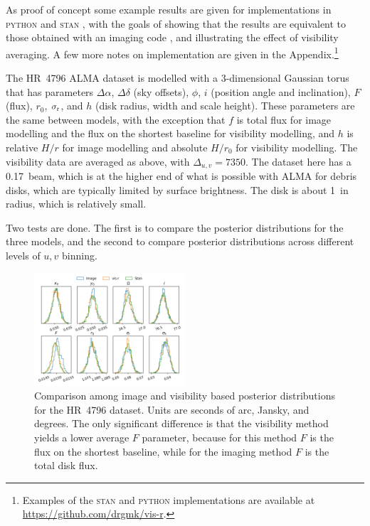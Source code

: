 \documentclass[fleqn,usenatbib]{mnras}
\begin{document}
As proof of concept some example results are given for implementations in \textsc{python} and \textsc{stan} \citep{2017JSS....76....1C}, with the goals of showing that the results are equivalent to those obtained with an imaging code \citep[e.g.][]{2021MNRAS.504.4497C}, and illustrating the effect of visibility averaging. A few more notes on implementation are given in the Appendix.\footnote{Examples of the \textsc{stan} and \textsc{python} implementations are available at \href{https://github.com/drgmk/vis-r}{https://github.com/drgmk/vis-r}.}


The HR~4796 ALMA dataset is modelled with a 3-dimensional Gaussian torus that has parameters $\Delta \alpha$, $\Delta \delta$ (sky offsets), $\phi$, $i$ (position angle and inclination), $F$ (flux), $r_0$, $\sigma_{\rm r}$, and $h$ (disk radius, width and scale height). These parameters are the same between models, with the exception that $f$ is total flux for image modelling and the flux on the shortest baseline for visibility modelling, and $h$ is relative $H/r$ for image modelling and absolute $H/r_0$ for visibility modelling. The visibility data are averaged as above, with $\Delta_{u,v} = 7350$. The dataset here has a 0.17\arcsec~beam, which is at the higher end of what is possible with ALMA for debris disks, which are typically limited by surface brightness. The disk is about 1\arcsec~in radius, which is relatively small. 

Two tests are done. The first is to compare the posterior distributions for the three models, and the second to compare posterior distributions across different levels of $u,v$ binning.

\begin{figure}
    \centering
    \includegraphics[width=0.5\textwidth]{comp.png}
    \caption{Comparison among image and visibility based posterior distributions for the HR~4796 dataset. Units are seconds of arc, Jansky, and degrees. The only significant difference is that the visibility method yields a lower average $F$ parameter, because for this method $F$ is the flux on the shortest baseline, while for the imaging method $F$ is the total disk flux.}
    \label{fig:comp}
\end{figure}
\end{document}
